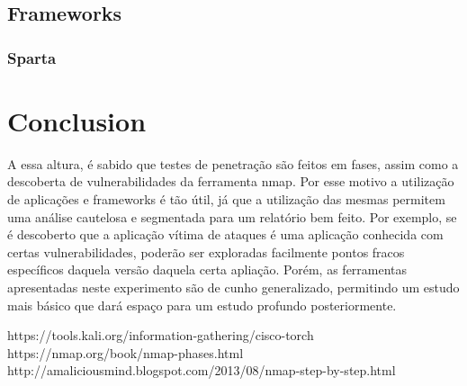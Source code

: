 \documentclass[journal]{IEEEtran}
\begin{document}
\subsection{Frameworks}
\subsubsection{Sparta}

\section{Conclusion}
A essa altura, é sabido que testes de penetração são feitos em fases, assim como a descoberta de vulnerabilidades da ferramenta nmap. Por esse motivo a utilização de aplicações e frameworks é tão útil, já que a utilização das mesmas permitem uma análise cautelosa e segmentada para um relatório bem feito. Por exemplo, se é descoberto que a aplicação vítima de ataques é uma aplicação conhecida com certas vul\-ne\-ra\-bi\-li\-da\-des, poderão ser exploradas facilmente pontos fracos específicos daquela versão daquela certa apliação. Porém, as ferramentas apresentadas neste experimento são de cunho generalizado, permitindo um estudo mais básico que dará espaço para um estudo profundo posteriormente.



\begin{thebibliography}{1}

https://tools.kali.org/information-gathering/cisco-torch
https://nmap.org/book/nmap-phases.html
http://amaliciousmind.blogspot.com/2013/08/nmap-step-by-step.html


\end{thebibliography}
\end{document}
